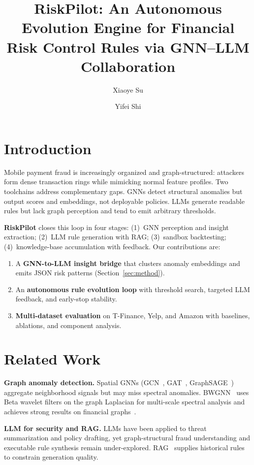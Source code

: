 \documentclass[sigconf,nonacm]{acmart}
\title{RiskPilot: An Autonomous Evolution Engine for Financial Risk Control Rules via GNN--LLM Collaboration}
\author{Xiaoye Su}
\affiliation{%
  \institution{Hongkong University of Science and Technology(Guangzhou)}
  \city{Guangzhou}
  \country{China}}
\author{Yifei Shi}
\affiliation{%
  \institution{Hongkong University of Science and Technology(Guangzhou)}
  \city{Guangzhou}
  \country{China}}
\begin{document}
\maketitle

\section{Introduction}
\label{sec:intro}

Mobile payment fraud is increasingly organized and graph-structured: attackers form dense transaction rings while mimicking normal feature profiles.
Two toolchains address complementary gaps. GNNs detect structural anomalies but output scores and embeddings, not deployable policies.
LLMs generate readable rules but lack graph perception and tend to emit arbitrary thresholds.

\textbf{RiskPilot} closes this loop in four stages: (1)~GNN perception and insight extraction; (2)~LLM rule generation with RAG; (3)~sandbox backtesting; (4)~knowledge-base accumulation with feedback.
Our contributions are:
\begin{enumerate}
  \item A \textbf{GNN-to-LLM insight bridge} that clusters anomaly embeddings and emits JSON risk patterns (Section~\ref{sec:method}).
  \item An \textbf{autonomous rule evolution loop} with threshold search, targeted LLM feedback, and early-stop stability.
  \item \textbf{Multi-dataset evaluation} on T-Finance, Yelp, and Amazon with baselines, ablations, and component analysis.
\end{enumerate}

\section{Related Work}
\label{sec:related}

\textbf{Graph anomaly detection.}
Spatial GNNs (GCN~\cite{kipf2017semi}, GAT~\cite{velickovic2018graph}, GraphSAGE~\cite{hamilton2017inductive}) aggregate neighborhood signals but may miss spectral anomalies.
BWGNN~\cite{tang2022rethinking} uses Beta wavelet filters on the graph Laplacian for multi-scale spectral analysis and achieves strong results on financial graphs~\cite{liu2022bond}.

\textbf{LLM for security and RAG.}
LLMs have been applied to threat summarization and policy drafting, yet graph-structural fraud understanding and executable rule synthesis remain under-explored.
RAG~\cite{lewis2020retrieval} supplies historical rules to constrain generation quality.
\end{document}
